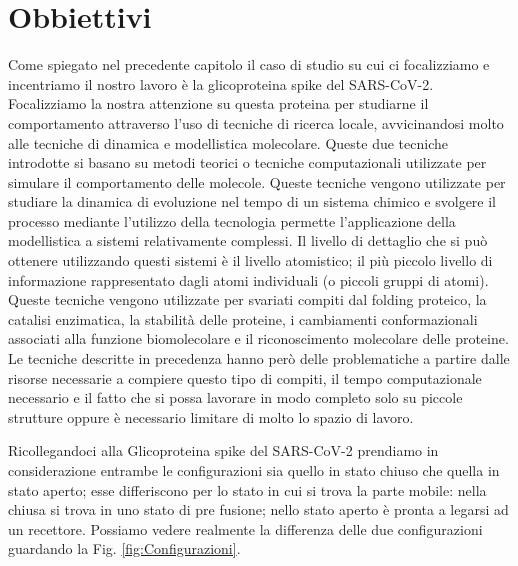 \chapter{Obbiettivi}\label{chapter:obbiettivi}
Come spiegato nel precedente capitolo il caso di studio su cui ci focalizziamo e incentriamo il nostro lavoro è la glicoproteina spike del SARS-CoV-2. Focalizziamo la nostra attenzione su questa proteina per studiarne il comportamento attraverso l'uso di tecniche di ricerca locale, avvicinandosi molto alle tecniche di dinamica e modellistica molecolare. Queste due tecniche introdotte si basano su metodi teorici o tecniche computazionali utilizzate per simulare il comportamento delle molecole. Queste tecniche vengono utilizzate per studiare la dinamica di evoluzione nel tempo di un sistema chimico e svolgere il processo mediante l'utilizzo della tecnologia permette l'applicazione della modellistica a sistemi relativamente complessi. Il livello di dettaglio che si può ottenere utilizzando questi sistemi è il livello atomistico; il più piccolo livello di informazione rappresentato dagli atomi individuali (o piccoli gruppi di atomi). Queste tecniche vengono utilizzate per svariati compiti dal folding proteico, la catalisi enzimatica, la stabilità delle proteine, i cambiamenti conformazionali associati alla funzione biomolecolare e il riconoscimento molecolare delle proteine. 
Le tecniche descritte in precedenza hanno però delle problematiche a partire dalle risorse necessarie a compiere questo tipo di compiti, il tempo computazionale necessario e il fatto che si possa lavorare in modo completo solo su piccole strutture oppure è necessario limitare di molto lo spazio di lavoro. 
 
Ricollegandoci alla Glicoproteina spike del SARS-CoV-2 prendiamo in considerazione entrambe le configurazioni sia quello in stato chiuso che quella in stato aperto; esse differiscono per lo stato in cui si trova la parte mobile: nella chiusa si trova in uno stato di pre fusione; nello stato aperto è pronta a legarsi ad un recettore. Possiamo vedere realmente la differenza delle due configurazioni guardando la Fig. \ref{fig:Configurazioni}.  

